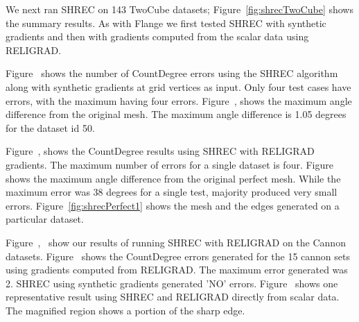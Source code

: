 We next ran SHREC on 143 TwoCube datasets; Figure~\ref{fig:shrecTwoCube} shows the summary results. As with Flange we first tested SHREC with synthetic gradients and then with gradients computed from the scalar data using RELIGRAD.

Figure~\protect{} shows the number of CountDegree errors using the SHREC algorithm along with synthetic gradients at grid vertices as input. Only four test cases have errors, with the maximum having four errors. 
Figure~\protect{}, shows the maximum angle difference from the original mesh. The maximum angle difference is 1.05 degrees for the dataset id 50.

Figure~\protect{}, shows the CountDegree results using SHREC with RELIGRAD gradients. The maximum number of errors for a single dataset is four. Figure~\protect{} shows the maximum angle difference from the original perfect mesh. While the maximum error was 38 degrees for a single test, majority produced very small errors. Figure~\ref{fig:shrecPerfect1} shows the mesh and the edges generated on a particular dataset.

Figure~\protect{},~\protect{} show our results of running SHREC with RELIGRAD on the Cannon datasets. Figure~\protect{} shows the CountDegree errors generated for the 15 cannon sets using gradients computed from RELIGRAD. The maximum error generated was 2. SHREC using synthetic gradients generated 'NO' errors. Figure~\protect{} shows one representative result using SHREC and RELIGRAD directly from scalar data. The magnified region shows a portion of the sharp edge. 


